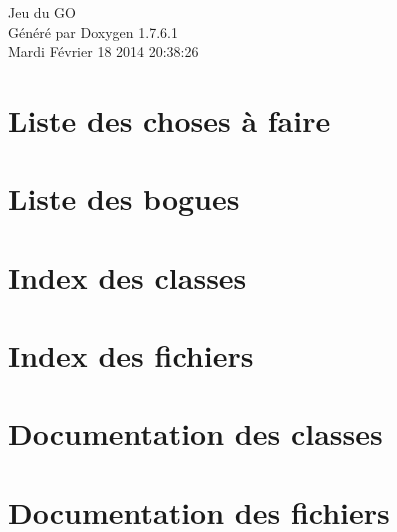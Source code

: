 \documentclass[a4paper]{book}
\begin{document}
\hypersetup{pageanchor=false,citecolor=blue}
\begin{titlepage}
\vspace*{7cm}
\begin{center}
{\Large \-Jeu du \-G\-O }\\
\vspace*{1cm}
{\large \-Généré par Doxygen 1.7.6.1}\\
\vspace*{0.5cm}
{\small Mardi Février 18 2014 20:38:26}\\
\end{center}
\end{titlepage}
\clearemptydoublepage
{}
\tableofcontents
\clearemptydoublepage
{}
\hypersetup{pageanchor=true,citecolor=blue}
\chapter{\-Liste des choses à faire}
\label{todo}
\hypertarget{todo}{}

\chapter{\-Liste des bogues}
\label{bug}
\hypertarget{bug}{}

\chapter{\-Index des classes}

\chapter{\-Index des fichiers}

\chapter{\-Documentation des classes}







\chapter{\-Documentation des fichiers}





































\printindex
\end{document}
